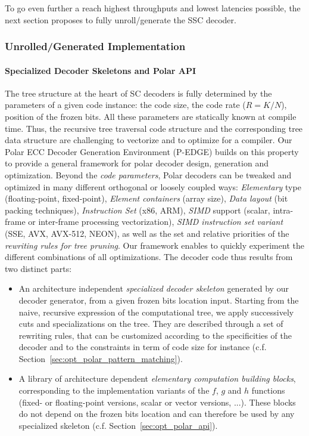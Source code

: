 To go even further a reach highest throughputs and lowest latencies possible,
the next section proposes to fully unroll/generate the SSC decoder.

\subsubsection{Unrolled/Generated Implementation}

\paragraph{Specialized Decoder Skeletons and Polar API}

The tree structure at the heart of SC decoders is fully determined by the
parameters of a given code instance: the code size, the code rate ($R = K / N$),
position of the frozen bits. All these parameters are  statically known at
compile time. Thus, the recursive tree traversal code structure and the
corresponding tree data structure are challenging to vectorize and to optimize
for a compiler. Our Polar ECC Decoder Generation Environment (P-EDGE) builds on
this property to provide a general framework for polar decoder design,
generation and optimization. Beyond the \emph{code parameters}, Polar decoders
can be tweaked and optimized in many different orthogonal or loosely coupled
ways: \emph{Elementary} type (floating-point, fixed-point),
\emph{Element containers} (array size), \emph{Data layout} (bit packing
techniques), \emph{Instruction Set} (x86, ARM\R), \emph{SIMD} support (scalar,
intra-frame or inter-frame processing vectorization), \emph{SIMD instruction set
variant} (SSE, AVX, AVX-512, NEON), as well as the set and relative priorities
of the \emph{rewriting rules for tree pruning}. Our framework enables to quickly
experiment the different combinations of all optimizations. The decoder code
thus results from two distinct parts:
\begin{itemize}
  \item An architecture independent \emph{specialized decoder skeleton}
    generated by our decoder generator, from a given frozen bits location input.
    Starting from the naive, recursive expression of the computational tree, we
    apply successively cuts and specializations on the tree. They are described
    through a set of rewriting rules, that can be customized according to the
    specificities of the decoder and to the constraints in term of code size for
    instance (c.f. Section~\ref{sec:opt_polar_pattern_matching}).
  \item A library of architecture dependent \emph{elementary computation
    building blocks}, corresponding to the implementation variants of the $f$,
    $g$ and $h$ functions (fixed- or floating-point versions, scalar or vector
    versions, ...). These blocks do not depend on the frozen bits location and
    can therefore be used by any specialized skeleton (c.f.
    Section~\ref{sec:opt_polar_api}).
\end{itemize}

